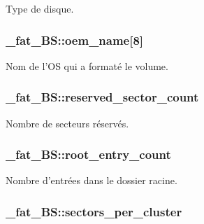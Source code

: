 Type de disque. \hypertarget{struct__fat__BS_a6e3cafc7b7a76af3f3d82b322bda2903}{
\subsubsection[{oem\+\_\+name}]{ \+\_\+fat\+\_\+\+B\+S\+::oem\+\_\+name\mbox{[}8\mbox{]}}}\label{struct__fat__BS_a6e3cafc7b7a76af3f3d82b322bda2903}
Nom de l'O\+S qui a formaté le volume. \hypertarget{struct__fat__BS_a7c4d28484980635def2bb6c1e6675b5a}{
\subsubsection[{reserved\+\_\+sector\+\_\+count}]{ \+\_\+fat\+\_\+\+B\+S\+::reserved\+\_\+sector\+\_\+count}}\label{struct__fat__BS_a7c4d28484980635def2bb6c1e6675b5a}
Nombre de secteurs réservés. \hypertarget{struct__fat__BS_ae9265a2e00c0c3cbb4de257b602bcd2c}{
\subsubsection[{root\+\_\+entry\+\_\+count}]{ \+\_\+fat\+\_\+\+B\+S\+::root\+\_\+entry\+\_\+count}}\label{struct__fat__BS_ae9265a2e00c0c3cbb4de257b602bcd2c}
Nombre d'entrées dans le dossier racine. \hypertarget{struct__fat__BS_ab26cacbe204fc157d8165af3ad86a33f}{
\subsubsection[{sectors\+\_\+per\+\_\+cluster}]{ \+\_\+fat\+\_\+\+B\+S\+::sectors\+\_\+per\+\_\+cluster}}\label{struct__fat__BS_ab26cacbe204fc157d8165af3ad86a33f}
